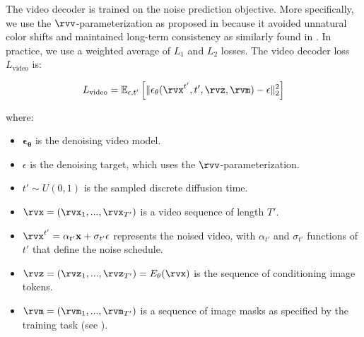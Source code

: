 The video decoder is trained on the noise prediction objective. More specifically, we use the $\rvv$-parameterization as proposed in \citep{salimans22} because it avoided unnatural color shifts and maintained long-term consistency as similarly found in \citep{ho2022imagen}. In practice, we use a weighted average of $L_1$ and $L_2$ losses. The video decoder loss $L_{\text{video}}$ is:

\begin{equation}
\label{eq:diffusion-loss}
L_{\text{video}}= \mathbb{E}_{\mathbf{\epsilon}, t'} \left[\lVert 
\mathbf{\epsilon}_{\theta}(\rvx^{t'}, t', \rvz, \rvm)
-
\mathbf{\epsilon}
\rVert^2_2 \right]
\end{equation}

where:
\begin{itemize}
\item $\mathbf{\epsilon}_\mathbf{\theta}$ is the denoising video model.
\item $\epsilon$ is the denoising target, which uses the $\rvv$-parameterization.
\item $t' \sim U(0,1)$ is the sampled discrete diffusion time.
\item $\rvx=(\rvx_1, ..., \rvx_{T'})$ is a video sequence of length $T'$.
\item $\rvx^{t'} = \alpha_{t'}\mathbf{x} + \sigma_{t'}\mathbf{\epsilon}$ represents the noised video, with $\alpha_{t'}$ and $\sigma_{t'}$ functions of $t'$ that define the noise schedule.
\item $\rvz=(\rvz_1, ..., \rvz_{T'}) = E_{\theta}(\rvx)$ is the sequence of conditioning image tokens.
\item $\rvm=(\rvm_1, ..., \rvm_{T'})$ is a sequence of image masks as specified by the training task (see ).
\end{itemize}



